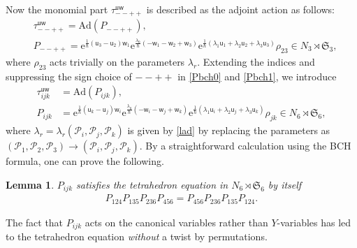 \documentclass[pdftex]{sigma}
\newcommand{\e}{{\mathrm e}}
\newcommand{\uu}{{\mathsf u}}
\newcommand{\ww}{{\mathsf w}}
\numberwithin{equation}{section}
\newtheorem{Lemma}[Theorem]{Lemma}
\begin{document}
Now the monomial part $\tau^{\uu\ww}_{--++}$
is described as the adjoint action as follows:
\begin{align}
&\tau^{\uu\ww}_{--++} = \mathrm{Ad}(P_{--++}),
\label{Pbch0}\\
&P_{--++}=
\e^{\tfrac{1}{\hbar}(\uu_3-\uu_2)\ww_1}
\e^{\tfrac{\lambda_0}{\hbar}(-\ww_1-\ww_2+\ww_3)}
\e^{\tfrac{1}{\hbar}(\lambda_1\uu_1+\lambda_2\uu_2+\lambda_3\uu_3)}\rho_{23}
\in N_3 \rtimes \mathfrak{S}_3,
\label{Pbch1}
\end{align}
where $\rho_{23}$ acts trivially on the parameters $\lambda_r$.
%
Extending the indices and suppressing the sign choice of $--++$ in \eqref{Pbch0} and \eqref{Pbch1}, we introduce
\begin{align}
\tau^{\uu\ww}_{ijk} &= \mathrm{Ad}(P_{ijk}),
\label{tijk}\\
P_{ijk} &=
\e^{\tfrac{1}{\hbar}(\uu_k-\uu_j)\ww_i}
\e^{\tfrac{\lambda_0}{\hbar}(-\ww_i-\ww_j+\ww_k)}
\e^{\tfrac{1}{\hbar}(\lambda_1\uu_i+\lambda_2\uu_j+\lambda_3\uu_k)}\rho_{jk}
\in N_6 \rtimes \mathfrak{S}_6,
\label{pijk}
\end{align}
where $\lambda_r=\lambda_r(\mathscr{P}_i, \mathscr{P}_j, \mathscr{P}_k)$ is given by
\eqref{lad} by replacing the parameters as
$(\mathscr{P}_1 ,\mathscr{P}_2 ,\mathscr{P}_3) \rightarrow
(\mathscr{P}_i ,\mathscr{P}_j ,\mathscr{P}_k)$.
%
By a straightforward calculation using the BCH formula, one can prove the following.
\begin{Lemma}\label{le:tep}
$P_{ijk}$ satisfies the tetrahedron equation in $N_6 \rtimes \mathfrak{S}_6$ by itself
\begin{align}\label{pte}
P_{124}P_{135}P_{236}P_{456} =
P_{456}P_{236}P_{135}P_{124}.
\end{align}
\end{Lemma}
The fact that $P_{ijk}$ acts on the canonical variables rather than $Y$-variables
has led to the tetrahedron equation {\em without} a twist by permutations.
\end{document}
